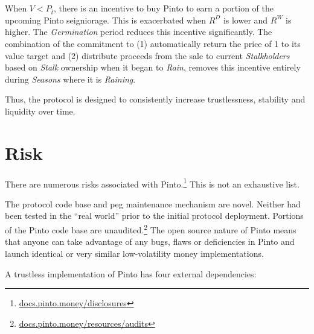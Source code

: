 \documentclass[tikz]{article}
\newcommand{\term}[1]{\textsl{#1}}
\newcommand{\fref}[1]{\footnote{\href{http://#1}{#1}}}
\newcommand{\Pinto}{} %
\begin{document}
\vspace{-0.15cm}

When $V < P_{\overline{t}}$, there is an incentive to buy Pinto to earn a portion of the upcoming Pinto seigniorage. This is exacerbated when $R^{D}$ is lower and $R^{W}$ is higher. The \term{Germination} period reduces this incentive significantly. The combination of the commitment to (1) automatically return the price of \Pinto1 to its value target and (2) distribute proceeds from the sale to current \term{Stalkholders} based on \term{Stalk} ownership when it began to \term{Rain}, removes this incentive entirely during \term{Seasons} where it is \term{Raining}.

\vspace{-0.15cm}

Thus, the protocol is designed to consistently increase trustlessness, stability and liquidity over time.


\vspace{-0.15cm}
\section{Risk}
\vspace{-0.15cm}

There are numerous risks associated with Pinto.\fref{docs.pinto.money/disclosures} This is not an exhaustive list.

\vspace{-0.15cm}

The protocol code base and peg maintenance mechanism are novel. Neither had been tested in the “real world” prior to the initial protocol deployment. Portions of the Pinto code base are unaudited.\footnote{\href{https://docs.pinto.money/resources/audits}{docs.pinto.money/resources/audits}} The open source nature of Pinto means that anyone can take advantage of any bugs, flaws or deficiencies in Pinto and launch identical or very similar low-volatility money implementations.

\vspace{-0.15cm}

A trustless implementation of Pinto has four external dependencies:
\end{document}
